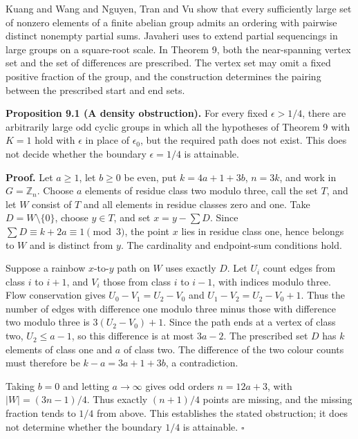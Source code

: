 \documentclass[11pt,a4paper]{article}
\newcommand{\statementstart}{\par\addvspace{6pt plus 1pt minus 1pt}\noindent}
\newcommand{\labelledparagraphstart}{\par\addvspace{3pt plus 1pt minus 1pt}\noindent}
\begin{document}
Kuang and Wang \cite[Theorem 1.6]{KW26} and Nguyen, Tran and Vu \cite[Theorem 1.5]{NTV26} show that every sufficiently large set of nonzero elements of a finite abelian group admits an ordering with pairwise distinct nonempty partial sums. Javaheri \cite[Lemma 4.5]{Jav26} uses \cite{MP25} to extend partial sequencings in large groups on a square-root scale. In Theorem 9, both the near-spanning vertex set and the set of differences are prescribed. The vertex set may omit a fixed positive fraction of the group, and the construction determines the pairing between the prescribed start and end sets.

\statementstart\textbf{Proposition 9.1 (A density obstruction).} For every fixed \(\epsilon>1/4\), there are arbitrarily large odd cyclic groups in which all the hypotheses of Theorem 9 with \(K=1\) hold with \(\epsilon\) in place of \(\epsilon_0\), but the required path does not exist. This does not decide whether the boundary \(\epsilon=1/4\) is attainable.

\labelledparagraphstart\textbf{Proof.} Let \(a\geq1\), let \(b\geq0\) be even, put \(k=4a+1+3b\), \(n=3k\), and work in \(G=\mathbb Z_n\). Choose \(a\) elements of residue class two modulo three, call the set \(T\), and let \(W\) consist of \(T\) and all elements in residue classes zero and one. Take \(D=W\setminus\{0\}\), choose \(y\in T\), and set \(x=y-\sum D\). Since \(\sum D\equiv k+2a\equiv1\pmod3\), the point \(x\) lies in residue class one, hence belongs to \(W\) and is distinct from \(y\). The cardinality and endpoint-sum conditions hold.

Suppose a rainbow \(x\)-to-\(y\) path on \(W\) uses exactly \(D\). Let \(U_i\) count edges from class \(i\) to \(i+1\), and \(V_i\) those from class \(i\) to \(i-1\), with indices modulo three. Flow conservation gives \(U_0-V_1=U_2-V_0\) and \(U_1-V_2=U_2-V_0+1\). Thus the number of edges with difference one modulo three minus those with difference two modulo three is \(3(U_2-V_0)+1\). Since the path ends at a vertex of class two, \(U_2\leq a-1\), so this difference is at most \(3a-2\). The prescribed set \(D\) has \(k\) elements of class one and \(a\) of class two. The difference of the two colour counts must therefore be \(k-a=3a+1+3b\), a contradiction.

Taking \(b=0\) and letting \(a\to\infty\) gives odd orders \(n=12a+3\), with \(|W|=(3n-1)/4\). Thus exactly \((n+1)/4\) points are missing, and the missing fraction tends to \(1/4\) from above. This establishes the stated obstruction; it does not determine whether the boundary \(1/4\) is attainable. \(\square\)
\end{document}
